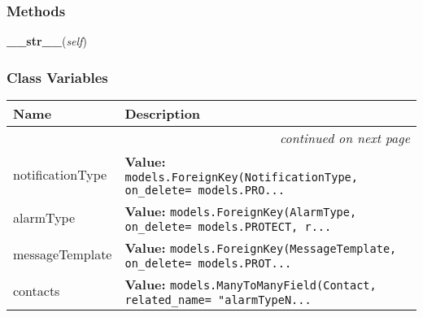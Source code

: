 
  \subsubsection{Methods}

    \label{GroundSegment:models:Notification:AlarmTypeNotificationType:AlarmTypeNotificationType:__str__}

    \vspace{0.5ex}

\hspace{.8\funcindent}\begin{boxedminipage}{\funcwidth}

    \raggedright \textbf{\_\_str\_\_}(\textit{self})

\setlength{\parskip}{2ex}
\setlength{\parskip}{1ex}
    \end{boxedminipage}



  \subsubsection{Class Variables}

    \vspace{-1cm}
\hspace{\varindent}\begin{longtable}{|p{\varnamewidth}|p{\vardescrwidth}|l}
\cline{1-2}
\cline{1-2} \centering \textbf{Name} & \centering \textbf{Description}& \\
\cline{1-2}
\endhead\cline{1-2}\multicolumn{3}{r}{\small\textit{continued on next page}}\\\endfoot\cline{1-2}
\endlastfoot\raggedright n\-o\-t\-i\-f\-i\-c\-a\-t\-i\-o\-n\-T\-y\-p\-e\- & \raggedright \textbf{Value:} 
{\tt models.ForeignKey(NotificationType, on\_delete= models.PRO\texttt{...}}&\\
\cline{1-2}
\raggedright a\-l\-a\-r\-m\-T\-y\-p\-e\- & \raggedright \textbf{Value:} 
{\tt models.ForeignKey(AlarmType, on\_delete= models.PROTECT, r\texttt{...}}&\\
\cline{1-2}
\raggedright m\-e\-s\-s\-a\-g\-e\-T\-e\-m\-p\-l\-a\-t\-e\- & \raggedright \textbf{Value:} 
{\tt models.ForeignKey(MessageTemplate, on\_delete= models.PROT\texttt{...}}&\\
\cline{1-2}
\raggedright c\-o\-n\-t\-a\-c\-t\-s\- & \raggedright \textbf{Value:} 
{\tt models.ManyToManyField(Contact, related\_name= "alarmTypeN\texttt{...}}&\\
\cline{1-2}
\end{longtable}


